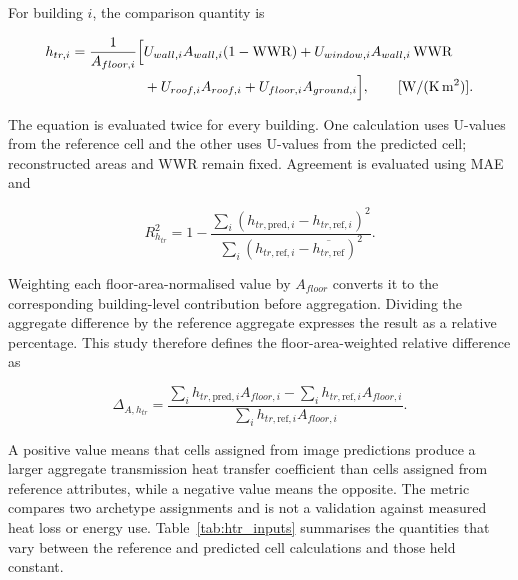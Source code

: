 For building $i$, the comparison quantity is

\begin{equation}
	\label{eq:htr}
	\begin{split}
		h_{tr,i} = \frac{1}{A_{floor,i}} \Bigl[
		 & U_{wall,i}A_{wall,i}(1-\mathrm{WWR}) + U_{window,i}A_{wall,i}\,\mathrm{WWR} \\
		 & + U_{roof,i}A_{roof,i} + U_{floor,i}A_{ground,i} \Bigr],
		 \qquad [\mathrm{W/(K\,m^2)}] .
	\end{split}
\end{equation}

The equation is evaluated twice for every building. One calculation uses U-values from the reference cell and the other uses U-values from the predicted cell; reconstructed areas and WWR remain fixed. Agreement is evaluated using MAE and

\begin{equation}
	\label{eq:htr_r2}
	R^2_{h_{tr}}
	= 1 - \frac{\sum_i\left(h_{tr,\mathrm{pred},i} - h_{tr,\mathrm{ref},i}\right)^2}
	{\sum_i\left(h_{tr,\mathrm{ref},i} - \overline{h_{tr,\mathrm{ref}}}\right)^2}.
\end{equation}

Weighting each floor-area-normalised value by $A_{floor}$ converts it to the corresponding building-level contribution before aggregation. Dividing the aggregate difference by the reference aggregate expresses the result as a relative percentage. This study therefore defines the floor-area-weighted relative difference as

\begin{equation}
	\label{eq:area_weighted_difference}
	\Delta_{A,h_{tr}}
	= \frac{\sum_i h_{tr,\mathrm{pred},i}A_{floor,i} - \sum_i h_{tr,\mathrm{ref},i}A_{floor,i}}
	{\sum_i h_{tr,\mathrm{ref},i}A_{floor,i}} .
\end{equation}

A positive value means that cells assigned from image predictions produce a larger aggregate transmission heat transfer coefficient than cells assigned from reference attributes, while a negative value means the opposite. The metric compares two archetype assignments and is not a validation against measured heat loss or energy use. Table~\ref{tab:htr_inputs} summarises the quantities that vary between the reference and predicted cell calculations and those held constant.

